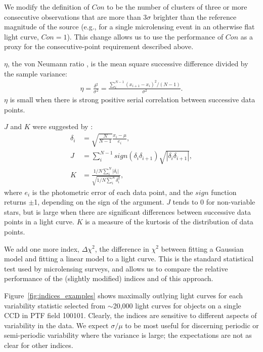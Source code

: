 \documentclass{emulateapj}
\begin{document}
We modify the definition of $Con$ to be the number of clusters of three or more consecutive observations that are more than $3\sigma$ brighter than the reference magnitude of the source (e.g., for a single microlensing event in an otherwise flat light curve, $Con=1$). This change allows us to use the performance of $Con$ as a proxy for the consecutive-point requirement described above. 

$\eta$, the von Neumann ratio \citep[][also known as the Durbin-Watson statistic]{von_neumann1941}, is the mean square successive difference divided by the sample variance:
\begin{align}
	\eta = \frac{\delta^2}{\sigma^2} = \frac{\sum^{N-1}_i(x_{i+1} - x_i)^2/(N-1)}{\sigma^2}.
\end{align}
$\eta$ is small when there is strong positive serial correlation between successive data points. 

$J$ and $K$ were suggested by \cite{stetson1996}:
\begin{align}
	\delta_i &= \sqrt{\frac{N}{N-1}}\frac{x_i-\mu}{e_i},\\
	J &= \sum^{N-1}_i sign(\delta_i \delta_{i+1})\sqrt{|\delta_i \delta_{i+1}|},\\
	K &= \frac{1/N\sum^N_i |\delta_i|}{\sqrt{1/N\sum^N_i\delta_i^2}},
\end{align}
where $e_i$ is the photometric error of each data point, and the $sign$ function returns $\pm$1, depending on the sign of the argument. $J$ tends to 0 for non-variable stars, but is large when there are significant differences between successive data points in a light curve. $K$ is a measure of the kurtosis of the distribution of data points.

We add one more index, $\Delta \chi^2$, the difference in $\chi^2$ between fitting a Gaussian model and fitting a linear model to a light curve. This is the standard statistical test used by microlensing surveys, and allows us to compare the relative performance of the (slightly modified) \cite{shin2009} indices and of this approach. 

Figure~\ref{fig:indices_examples} shows maximally outlying light curves for each variability statistic selected from $\sim$20,000 light curves for objects on a single CCD in PTF field 100101. %
Clearly, the indices are sensitive to different aspects of variability in the data. We expect $\sigma/\mu$ to be most useful for discerning periodic or semi-periodic variability where the variance is large; the expectations are not as clear for other indices. 
\end{document}
